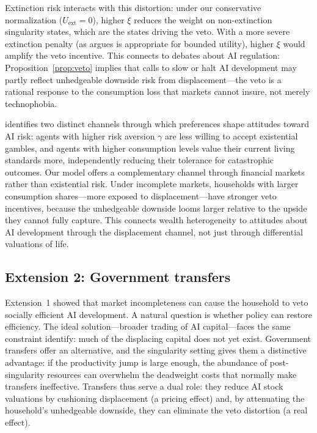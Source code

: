 \documentclass[12pt]{article}
\begin{document}
Extinction risk interacts with this distortion: under our conservative normalization ($U_\text{ext} = 0$), higher $\xi$ reduces the weight on non-extinction singularity states, which are the states driving the veto. With a more severe extinction penalty (as \citet{Jones2024} argues is appropriate for bounded utility), higher $\xi$ would amplify the veto incentive. This connects to debates about AI regulation: Proposition~\ref{prop:veto} implies that calls to slow or halt AI development may partly reflect unhedgeable downside risk from displacement---the veto is a rational response to the consumption loss that markets cannot insure, not merely technophobia.

\citet{Jones2024} identifies two distinct channels through which preferences shape attitudes toward AI risk: agents with higher risk aversion $\gamma$ are less willing to accept existential gambles, and agents with higher consumption levels value their current living standards more, independently reducing their tolerance for catastrophic outcomes. Our model offers a complementary channel through financial markets rather than existential risk. Under incomplete markets, households with larger consumption shares---more exposed to displacement---have stronger veto incentives, because the unhedgeable downside looms larger relative to the upside they cannot fully capture. This connects wealth heterogeneity to attitudes about AI development through the displacement channel, not just through differential valuations of life.

\subsection{Extension 2: Government transfers} \label{sec:ext2} %

Extension~1 showed that market incompleteness can cause the household to veto socially efficient AI development. A natural question is whether policy can restore efficiency. The ideal solution---broader trading of AI capital---faces the same constraint \citet{GKP2012} identify: much of the displacing capital does not yet exist. Government transfers offer an alternative, and the singularity setting gives them a distinctive advantage: if the productivity jump is large enough, the abundance of post-singularity resources can overwhelm the deadweight costs that normally make transfers ineffective. Transfers thus serve a dual role: they reduce AI stock valuations by cushioning displacement (a pricing effect) and, by attenuating the household's unhedgeable downside, they can eliminate the veto distortion (a real effect).
\end{document}
